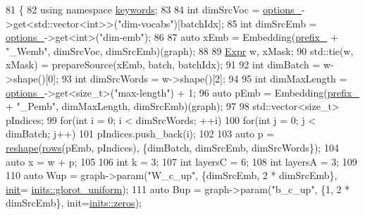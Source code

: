 \begin{DoxyCode}
81                                            \{
82     \textcolor{keyword}{using namespace }\hyperlink{namespacekeywords}{keywords};
83 
84     \textcolor{keywordtype}{int} dimSrcVoc = \hyperlink{classmarian_1_1EncoderBase_a42fa90e65cd49dacccae154bf7873d97}{options\_}->get<std::vector<int>>(\textcolor{stringliteral}{"dim-vocabs"})[batchIdx];
85     \textcolor{keywordtype}{int} dimSrcEmb = \hyperlink{classmarian_1_1EncoderBase_a42fa90e65cd49dacccae154bf7873d97}{options\_}->get<\textcolor{keywordtype}{int}>(\textcolor{stringliteral}{"dim-emb"});
86 
87     \textcolor{keyword}{auto} xEmb = Embedding(\hyperlink{classmarian_1_1EncoderBase_abbd764c19ebaae1d6e4ffec0c9930fba}{prefix\_} + \textcolor{stringliteral}{"\_Wemb"}, dimSrcVoc, dimSrcEmb)(graph);
88 
89     \hyperlink{namespacemarian_a498d8baf75b754011078b890b39c8e12}{Expr} w, xMask;
90     std::tie(w, xMask) = prepareSource(xEmb, batch, batchIdx);
91 
92     \textcolor{keywordtype}{int} dimBatch = w->shape()[0];
93     \textcolor{keywordtype}{int} dimSrcWords = w->shape()[2];
94 
95     \textcolor{keywordtype}{int} dimMaxLength = \hyperlink{classmarian_1_1EncoderBase_a42fa90e65cd49dacccae154bf7873d97}{options\_}->get<\textcolor{keywordtype}{size\_t}>(\textcolor{stringliteral}{"max-length"}) + 1;
96     \textcolor{keyword}{auto} pEmb = Embedding(\hyperlink{classmarian_1_1EncoderBase_abbd764c19ebaae1d6e4ffec0c9930fba}{prefix\_} + \textcolor{stringliteral}{"\_Pemb"}, dimMaxLength, dimSrcEmb)(graph);
97 
98     std::vector<size\_t> pIndices;
99     \textcolor{keywordflow}{for}(\textcolor{keywordtype}{int} i = 0; i < dimSrcWords; ++i)
100       \textcolor{keywordflow}{for}(\textcolor{keywordtype}{int} j = 0; j < dimBatch; j++)
101         pIndices.push\_back(i);
102 
103     \textcolor{keyword}{auto} p = \hyperlink{namespacemarian_acd984f43188d0ae23c2a6ef13ae5293f}{reshape}(\hyperlink{namespacemarian_ace1e9a63d52edc363d70d661cf8d0257}{rows}(pEmb, pIndices), \{dimBatch, dimSrcEmb, dimSrcWords\});
104     \textcolor{keyword}{auto} x = w + p;
105 
106     \textcolor{keywordtype}{int} k = 3;
107     \textcolor{keywordtype}{int} layersC = 6;
108     \textcolor{keywordtype}{int} layersA = 3;
109 
110     \textcolor{keyword}{auto} Wup = graph->param(\textcolor{stringliteral}{"W\_c\_up"}, \{dimSrcEmb, 2 * dimSrcEmb\}, \hyperlink{amunmt_8cpp_a2e8ddb8bd2f3405f554c9f2c52277f4b}{init}=
      \hyperlink{namespacemarian_1_1inits_a8838c47537f434b855491cd3ed97ccd1}{inits::glorot\_uniform});
111     \textcolor{keyword}{auto} Bup = graph->param(\textcolor{stringliteral}{"b\_c\_up"}, \{1, 2 * dimSrcEmb\}, init=\hyperlink{namespacemarian_1_1inits_a1bd34fd256e3df7bb1e27955a7f2b359}{inits::zeros});

\end{DoxyCode}
